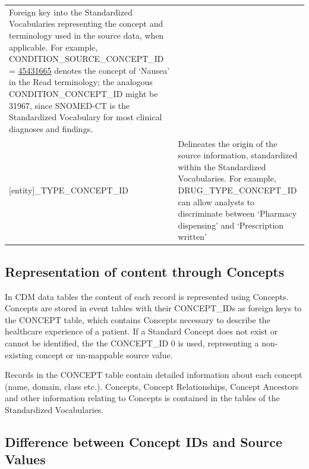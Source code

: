 \documentclass[11pt]{book}
\begin{document}
\begin{longtable}[]{@{}ll@{}}
\begin{minipage}[t]{0.61\columnwidth}
Foreign key into the Standardized Vocabularies representing the concept
and terminology used in the source data, when applicable. For example,
CONDITION\_SOURCE\_CONCEPT\_ID =
\href{http://athena.ohdsi.org/search-terms/terms/45431665}{45431665}
denotes the concept of `Nausea' in the Read terminology; the analogous
CONDITION\_CONCEPT\_ID might be 31967, since SNOMED-CT is the
Standardized Vocabulary for most clinical diagnoses and findings.\strut
\end{minipage}\tabularnewline
\begin{minipage}[t]{0.34\columnwidth}\raggedright\strut
{[}entity{]}\_TYPE\_CONCEPT\_ID\strut
\end{minipage} & \begin{minipage}[t]{0.61\columnwidth}\raggedright\strut
Delineates the origin of the source information, standardized within the
Standardized Vocabularies. For example, DRUG\_TYPE\_CONCEPT\_ID can
allow analysts to discriminate between `Pharmacy dispensing' and
`Prescription written'\strut
\end{minipage}\tabularnewline
\bottomrule
\end{longtable}

\subsection{Representation of content through
Concepts}\label{representation-of-content-through-concepts}

In CDM data tables the content of each record is represented using
Concepts. Concepts are stored in event tables with their CONCEPT\_IDs as
foreign keys to the CONCEPT table, which contains Concepts necessary to
describe the healthcare experience of a patient. If a Standard Concept
does not exist or cannot be identified, the the CONCEPT\_ID 0 is used,
representing a non-existing concept or un-mappable source value.

Records in the CONCEPT table contain detailed information about each
concept (name, domain, class etc.). Concepts, Concept Relationships,
Concept Ancestors and other information relating to Concepts is
contained in the tables of the Standardized Vocabularies.

\subsection{Difference between Concept IDs and Source
Values}\label{difference-between-concept-ids-and-source-values}
\end{document}
